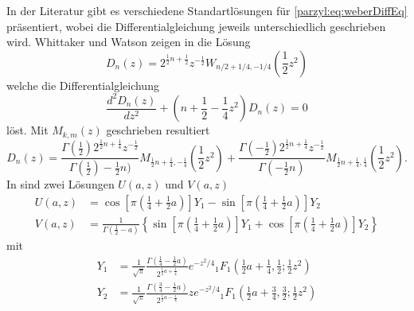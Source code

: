 In der Literatur gibt es verschiedene Standartlösungen für 
\eqref{parzyl:eq:weberDiffEq} präsentiert, wobei die Differentialgleichung jeweils 
unterschiedlich geschrieben wird.
Whittaker und Watson zeigen in \cite{parzyl:whittaker} die Lösung
\begin{equation}
    D_n(z) = 2^{\frac{1}{2}n + \frac{1}{2}} z^{-\frac{1}{2}} W_{n/2 + 1/4, -1/4}\left(\frac{1}{2}z^2\right)
\end{equation}
welche die Differentialgleichung
\begin{equation}
    \frac{d^2D_n(z)}{dz^2} + \left(n + \frac{1}{2} - \frac{1}{4} z^2\right)D_n(z) = 0
\end{equation}
löst.
Mit $M_{k,m}(z)$ geschrieben resultiert
\begin{equation}
    D_n(z) = \frac{
            \Gamma \left( {\textstyle \frac{1}{2}}\right) 2^{\frac{1}{2}n + \frac{1}{4}} z^{-\frac{1}{2}}
        }{
            \Gamma \left( {\textstyle \frac{1}{2}} \right) - {\textstyle \frac{1}{2}} n)
        }
        M_{\frac{1}{2} n + \frac{1}{4}, - \frac{1}{4}} \left(\frac{1}{2}z^2\right)
        +
        \frac{
            \Gamma\left(-{\textstyle \frac{1}{2}}\right) 2^{\frac{1}{2}n + \frac{1}{4}} z^{-\frac{1}{2}}
        }{
            \Gamma\left(- {\textstyle \frac{1}{2}} n\right)
        }
        M_{\frac{1}{2} n + \frac{1}{4}, \frac{1}{4}} \left(\frac{1}{2}z^2\right).
\end{equation}
In \cite{parzyl:abramowitz-stegun} sind zwei Lösungen $U(a, z)$ und $V(a,z)$ 
\begin{align}
    U(a,z) &= 
    \cos\left[\pi \left({\textstyle \frac{1}{4}} + {\textstyle \frac{1}{2}} a\right)\right] Y_1
    - \sin\left[\pi \left({\textstyle \frac{1}{4}} + {\textstyle \frac{1}{2}} a\right)\right] Y_2 \\
    V(a,z) &= \frac{1}{\Gamma \left({\textstyle \frac{1}{2} - a}\right)} \left\{
    \sin\left[\pi \left({\textstyle \frac{1}{4}} + {\textstyle \frac{1}{2}} a\right)\right] Y_1
    + \cos\left[\pi \left({\textstyle \frac{1}{4}} + {\textstyle \frac{1}{2}} a\right)\right] Y_2
    \right\}
\end{align}
mit
\begin{align}
    Y_1 &= \frac{1}{\sqrt{\pi}} 
            \frac{\Gamma\left({\textstyle \frac{1}{4} - 
            {\textstyle \frac{1}{2}}a}\right)}
            {2^{\frac{1}{2} a + \frac{1}{4}}}
            e^{-z^2/4} 
            {}_{1} F_{1}
                \left({\textstyle \frac{1}{2}}a + {\textstyle \frac{1}{4}}, 
                {\textstyle \frac{1}{2}} ; 
                {\textstyle \frac{1}{2}}z^2\right)
            \\
    Y_2 &= \frac{1}{\sqrt{\pi}} 
            \frac{\Gamma\left({\textstyle \frac{3}{4} - 
            {\textstyle \frac{1}{2}}a}\right)}
            {2^{\frac{1}{2} a - \frac{1}{4}}} 
            z e^{-z^2/4} 
            {}_{1} F_{1}
                \left({\textstyle \frac{1}{2}}a + {\textstyle \frac{3}{4}}, 
                {\textstyle \frac{3}{2}} ; 
                {\textstyle \frac{1}{2}}z^2\right)
\end{align}
